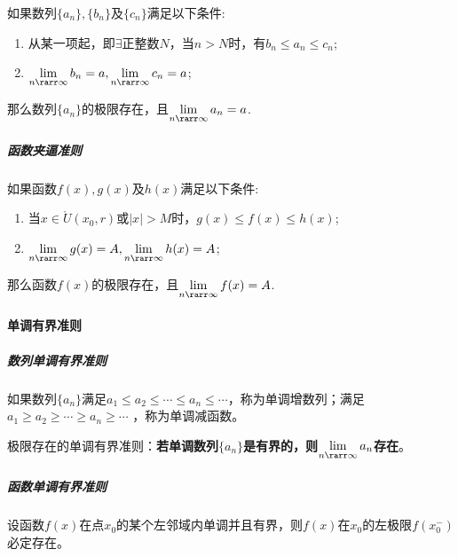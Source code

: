 \documentclass[
]{article}
\begin{document}
如果数列\(\{a_n\},\{b_n\}\)及\(\{c_n\}\)满足以下条件:

\begin{enumerate}
\def\labelenumi{\arabic{enumi}.}
\item
  从某一项起，即\(\exists\)正整数\(N\)，当\(n > N\)时，有\(b_n \le a_n \le c_n\);
\item
  \(\lim\limits_{n \rarr \infty} b_n = a, \lim\limits_{n \rarr \infty}c_n=a\);
\end{enumerate}

那么数列\(\{a_n\}\)的极限存在，且\(\lim\limits_{n \rarr \infty}a_n = a\).

\hypertarget{ux51fdux6570ux5939ux903cux51c6ux5219}{%
\subparagraph{函数夹逼准则}\label{ux51fdux6570ux5939ux903cux51c6ux5219}}

如果函数\(f(x),g(x)\)及\(h(x)\)满足以下条件:

\begin{enumerate}
\def\labelenumi{\arabic{enumi}.}
\item
  当\(x \in \mathring{U}(x_0,r)\)或\(\vert x \vert > M\)时，\(g(x)\le f(x)\le h(x)\);
\item
  \(\lim\limits_{n \rarr \infty} g(x) = A, \lim\limits_{n \rarr \infty}h(x)=A\);
\end{enumerate}

那么函数\(f(x)\)的极限存在，且\(\lim\limits_{n \rarr \infty}f(x) = A\).

\hypertarget{ux5355ux8c03ux6709ux754cux51c6ux5219}{%
\paragraph{单调有界准则}\label{ux5355ux8c03ux6709ux754cux51c6ux5219}}

\hypertarget{ux6570ux5217ux5355ux8c03ux6709ux754cux51c6ux5219}{%
\subparagraph{数列单调有界准则}\label{ux6570ux5217ux5355ux8c03ux6709ux754cux51c6ux5219}}

如果数列\(\{a_n\}\)满足\(a_1 \le a_2 \le \cdots \le a_n \le \cdots\)，称为单调增数列；满足\(a_1 \ge a_2 \ge \cdots \ge a_n \ge \cdots\)
，称为单调减函数。

极限存在的单调有界准则：\textbf{若单调数列\(\{a_n\}\)是有界的，则\(\lim\limits_{n \rarr \infty}a_n \)存在}。

\hypertarget{ux51fdux6570ux5355ux8c03ux6709ux754cux51c6ux5219}{%
\subparagraph{函数单调有界准则}\label{ux51fdux6570ux5355ux8c03ux6709ux754cux51c6ux5219}}

设函数\(f(x)\)在点\(x_{0}\)的某个左邻域内单调并且有界，则\(f(x)\)在\(x_0 \)的左极限\(f(x_0^-)\)必定存在。
\end{document}
